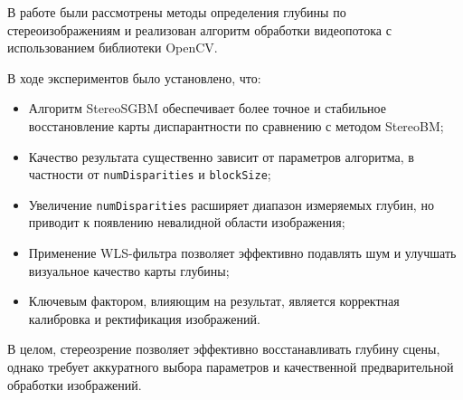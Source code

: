 	В работе были рассмотрены методы определения глубины по стереоизображениям и реализован алгоритм обработки видеопотока с использованием библиотеки OpenCV.
	
	В ходе экспериментов было установлено, что:
	
	\begin{itemize}
		\item Алгоритм StereoSGBM обеспечивает более точное и стабильное восстановление карты диспарантности по сравнению с методом StereoBM;
		\item Качество результата существенно зависит от параметров алгоритма, в частности от \texttt{numDisparities} и \texttt{blockSize};
		\item Увеличение \texttt{numDisparities} расширяет диапазон измеряемых глубин, но приводит к появлению невалидной области изображения;
		\item Применение WLS-фильтра позволяет эффективно подавлять шум и улучшать визуальное качество карты глубины;
		\item Ключевым фактором, влияющим на результат, является корректная калибровка и ректификация изображений.
	\end{itemize}
	
	В целом, стереозрение позволяет эффективно восстанавливать глубину сцены, однако требует аккуратного выбора параметров и качественной предварительной обработки изображений.

	
